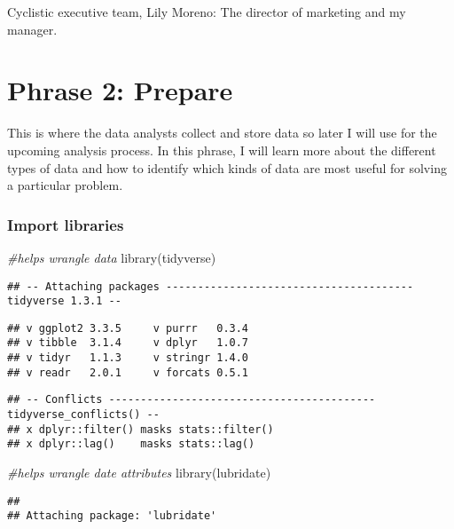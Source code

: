 \documentclass[
]{article}
\newenvironment{Shaded}{\begin{snugshade}}{\end{snugshade}}
\newcommand{\CommentTok}[1]{\textcolor[rgb]{0.56,0.35,0.01}{\textit{#1}}}
\newcommand{\FunctionTok}[1]{\textcolor[rgb]{0.00,0.00,0.00}{#1}}
\newcommand{\NormalTok}[1]{#1}
\begin{document}
Cyclistic executive team, Lily Moreno: The director of marketing and my
manager.

\hypertarget{phrase-2-prepare}{%
\section{Phrase 2: Prepare}\label{phrase-2-prepare}}

This is where the data analysts collect and store data so later I will
use for the upcoming analysis process. In this phrase, I will learn more
about the different types of data and how to identify which kinds of
data are most useful for solving a particular problem.

\hypertarget{import-libraries}{%
\subsubsection{Import libraries}\label{import-libraries}}

\begin{Shaded}
\begin{Highlighting}[]
\CommentTok{\#helps wrangle data}
\FunctionTok{library}\NormalTok{(tidyverse)  }
\end{Highlighting}
\end{Shaded}

\begin{verbatim}
## -- Attaching packages --------------------------------------- tidyverse 1.3.1 --
\end{verbatim}

\begin{verbatim}
## v ggplot2 3.3.5     v purrr   0.3.4
## v tibble  3.1.4     v dplyr   1.0.7
## v tidyr   1.1.3     v stringr 1.4.0
## v readr   2.0.1     v forcats 0.5.1
\end{verbatim}

\begin{verbatim}
## -- Conflicts ------------------------------------------ tidyverse_conflicts() --
## x dplyr::filter() masks stats::filter()
## x dplyr::lag()    masks stats::lag()
\end{verbatim}

\begin{Shaded}
\begin{Highlighting}[]
\CommentTok{\#helps wrangle date attributes}
\FunctionTok{library}\NormalTok{(lubridate)  }
\end{Highlighting}
\end{Shaded}

\begin{verbatim}
## 
## Attaching package: 'lubridate'
\end{verbatim}
\end{document}
